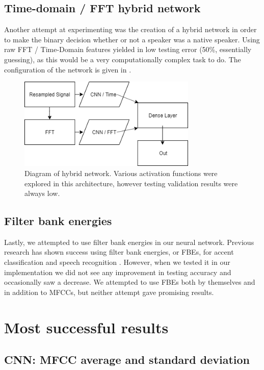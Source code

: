 \documentclass{article}
\begin{document}
\subsection{Time-domain / FFT hybrid network}
\label{subsec:fft}

Another attempt at experimenting was the creation of a hybrid network in order to make the binary decision whether or not a speaker was a native speaker.
Using raw FFT / Time-Domain features yielded in low testing error (50\%, essentially guessing), as this would be a very computationally complex task to do.
The configuration of the network is given in .

\begin{figure}[htb]
	\centering
	\includegraphics[width = 8.5cm]{figs/hybrid_network}
	\caption{Diagram of hybrid network.
	Various activation functions were explored in this architecture, however testing validation results were always low.}
	\label{fig:hybrid}
\end{figure}

\subsection{Filter bank energies}
\label{subsec:fbe}

Lastly, we attempted to use filter bank energies in our neural network.
Previous research has shown success using filter bank energies, or FBEs, for accent classification and speech recognition \cite{Paliwal, chuaccent}.
However, when we tested it in our implementation we did not see any improvement in testing accuracy and occasionally saw a decrease.
We attempted to use FBEs both by themselves and in addition to MFCCs, but neither attempt gave promising results.

\section{Most successful results}
\label{sec:success}

\subsection{CNN: MFCC average and standard deviation}
\label{subsec:cnn}
\end{document}
